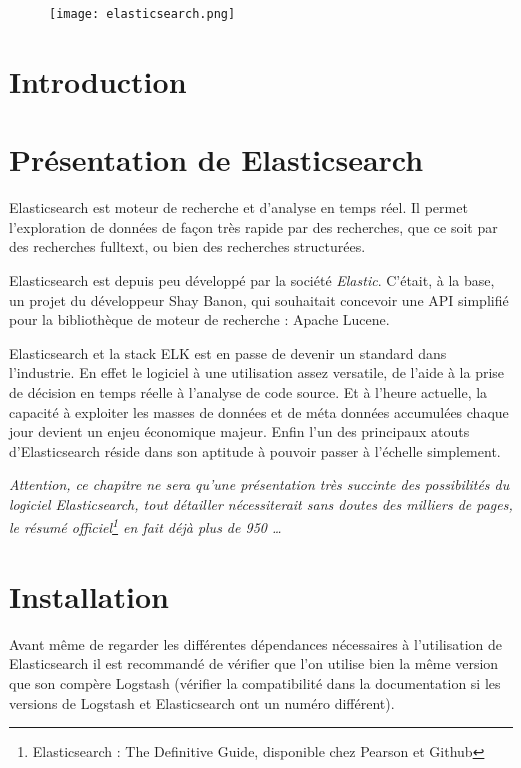 
\begin{figure}[H]
\center
\texttt{[image: elasticsearch.png]}
\label{fig:elasticsearchlogo.png}
\end{figure}
\section{Introduction}

\section{Présentation de Elasticsearch}
Elasticsearch est moteur de recherche et d'analyse en temps réel. Il permet l'exploration
de données de façon très rapide par des recherches, que ce soit par des recherches
\gls{fulltext}, ou bien des recherches structurées.

Elasticsearch est depuis peu développé par la société \emph{Elastic}. C'était, à 
la base, un projet du développeur Shay Banon, qui souhaitait concevoir une API simplifié
pour la bibliothèque de moteur de recherche : Apache Lucene.

Elasticsearch et la stack ELK est en passe de devenir un standard dans l'industrie.
En effet le logiciel à une utilisation assez versatile, de l'aide à la prise de 
décision en temps réelle à l'analyse de code source. Et à l'heure actuelle, la capacité 
à exploiter les masses de données et de méta données accumulées chaque jour devient 
un enjeu économique majeur. Enfin l'un des principaux 
atouts d'Elasticsearch réside dans son aptitude à pouvoir passer à l'échelle simplement.

\footnotesize{\emph{Attention, ce chapitre ne sera qu'une présentation très succinte des possibilités 
du logiciel Elasticsearch, tout détailler nécessiterait \emph{sans doutes} des milliers
de pages, le résumé officiel\footnote{Elasticsearch : The Definitive Guide, disponible 
chez Pearson et Github}
en fait déjà \emph{plus de 950} \ldots}}

\section{Installation}
Avant même de regarder les différentes dépendances nécessaires à l'utilisation de
Elasticsearch il est recommandé de vérifier que l'on utilise bien la même version
que son compère Logstash (vérifier la compatibilité dans la documentation si les
versions de Logstash et Elasticsearch ont un numéro différent).

